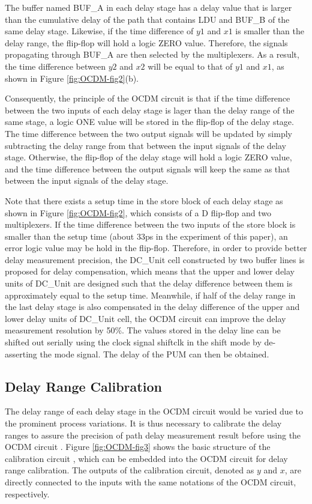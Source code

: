 The buffer named BUF\_A in each delay stage has a delay value that is larger than the cumulative delay of the path that contains LDU and BUF\_B of the same delay stage. Likewise, if the time difference of $y1$ and $x1$ is smaller than the delay range, the flip-flop will hold a logic ZERO value. Therefore, the signals propagating through BUF\_A are then selected by the multiplexers. As a result, the time difference between $y2$ and $x2$ will be equal to that of $y1$ and $x1$, as shown in Figure \ref{fig:OCDM-fig2}(b).

Consequently, the principle of the OCDM circuit is that if the time difference between the two inputs of each delay stage is lager than the delay range of the same stage, a logic ONE value will be stored in the flip-flop of the delay stage. The time difference between the two output signals will be updated by simply subtracting the delay range from that between the input signals of the delay stage. Otherwise, the flip-flop of the delay stage will hold a logic ZERO value, and the time difference between the output signals will keep the same as that between the input signals of the delay stage.


Note that there exists a setup time in the store block of each delay stage as shown in Figure \ref{fig:OCDM-fig2}, which consists of a D flip-flop and two multiplexers. If the time difference between the two inputs of the store block is smaller than the setup time (about 33ps in the experiment of this paper), an error logic value may be hold in the flip-flop. Therefore, in order to provide better delay measurement precision, the DC\_Unit cell constructed by two buffer lines is proposed for delay compensation, which means that the upper and lower delay units of DC\_Unit are designed such that the delay difference between them is approximately equal to the setup time. Meanwhile, if half of the delay range in the last delay stage is also compensated in the delay difference of the upper and lower delay units of DC\_Unit cell, the OCDM circuit can improve the delay measurement resolution by 50\%. The values stored in the delay line can be shifted out serially using the clock signal shiftclk in the shift mode by de-asserting the mode signal. The delay of the PUM can then be obtained.

\subsection{Delay Range Calibration}
The delay range of each delay stage in the OCDM circuit would be varied due to the prominent process variations. It is thus necessary to calibrate the delay ranges to assure the precision of path delay measurement result before using the OCDM circuit \cite{blaauw2008statistical} \cite{agarwal2003statistical} \cite{tsai2008all} \cite{datta2006scheme}. Figure \ref{fig:OCDM-fig3} shows the basic structure of the calibration circuit \cite{tsai2008all} \cite{datta2006scheme}, which can be embedded into the OCDM circuit for delay range calibration. The outputs of the calibration circuit, denoted as $y$ and $x$, are directly connected to the inputs with the same notations of the OCDM circuit, respectively.

